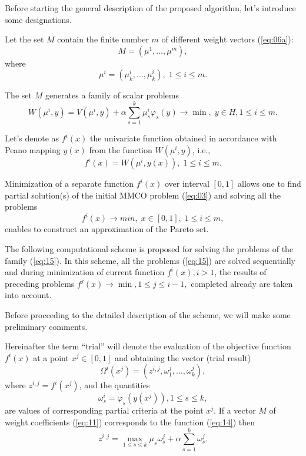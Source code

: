 \documentclass[runningheads]{llncs}
\begin{document}
Before starting the general description of the proposed algorithm, let's introduce some designations. 

Let the set $M$ contain the finite number $m$ of different weight vectors (\ref{eq:06a}):
\begin{equation}
    \label{eq:11}
    M=(\mu^1, \dots, \mu^m),
\end{equation}
where
\begin{equation}
    \label{eq:12}
    \mu^i=(\mu^i_k, \dots, \mu^i_k), \; 1 \leq i \leq m.
\end{equation}

The set $M$ generates a family   of scalar problems 
\begin{equation}
    \label{eq:13}
    W(\mu^i, y)= V(\mu^i, y) + \alpha \sum^k_{s=1}\mu^i_s \varphi_s (y) \to \min, \; y \in H, 1 \leq i \leq m.
\end{equation}

Let's denote as $f^i(x)$ the univariate function obtained in accordance with Peano mapping $y(x)$ from the function $W(\mu^i, y)$, i.e.,
\begin{equation}
    \label{eq:14}
    f^i(x) = W(\mu^i, y(x)), \; 1 \leq i \leq m.
\end{equation}

Minimization of a separate function $f^i(x)$ over interval $[0,1]$ allows one to find partial solution(s) of the initial MMCO problem (\ref{eq:03}) and solving all the problems
\begin{equation}
    \label{eq:15}
    f^i(x) \to min, \; x \in [0,1], \; 1 \leq i \leq m,
\end{equation}
enables to construct an approximation of the Pareto set.

The following computational scheme is proposed for solving the problems of the family (\ref{eq:15}). In this scheme, all the problems (\ref{eq:15}) are solved sequentially and during minimization of current function $f^i(x), i > 1$, the results of preceding problems $f^j(x) \to \min, 1 \leq j \leq i - 1,$ completed already are taken into account.

Before proceeding to the detailed description of the scheme, we will make some preliminary comments. 

Hereinafter the term ``trial'' will denote the evaluation of the objective function $f^i(x)$ at a point $x^j \in [0,1]$ and obtaining the vector (trial result)
\begin{equation}
    \label{eq:15a}
    \Omega^i(x^j)=(z^{i,j}, \omega^j_1, \dots, \omega^j_k),
\end{equation}
where $z^{i, j}=f^i(x^j)$, and the quantities
\begin{equation}
    \label{eq:16}
    \omega^i_s=\varphi_s(y(x^j)), 1 \leq s \leq k,
\end{equation}
are values of corresponding partial criteria at the point $x^j$. If a vector $M$ of weight coefficients (\ref{eq:11}) corresponds to the function (\ref{eq:14}) then 
\begin{equation}
    \label{eq:17}
    z^{i, j} = \max_{1\leq s \leq k} \mu_s \omega^j_s + \alpha \sum^k_{s=1} \omega^j_s.
\end{equation}
\end{document}
